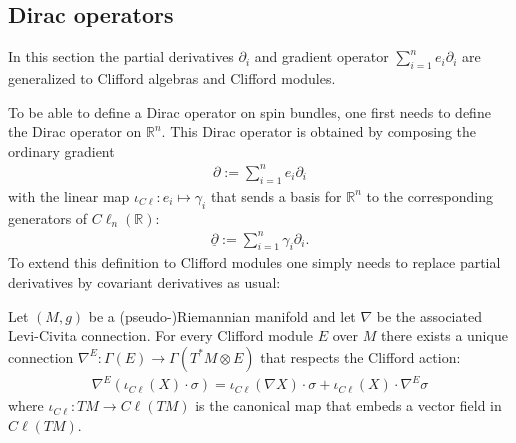 \subsection{Dirac operators}

    In this section the partial derivatives $\partial_i$ and gradient operator $\sum_{i=1}^ne_i\partial_i$ are generalized to Clifford algebras and Clifford modules.



    To be able to define a Dirac operator on spin bundles, one first needs to define the Dirac operator on $\mathbb{R}^n$. This Dirac operator is obtained by composing the ordinary gradient
    \begin{gather}
        \partial:=\sum_{i=1}^ne_i\partial_i
    \end{gather}
    with the linear map $\iota_{C\ell}:e_i\mapsto\gamma_i$ that sends a basis for $\mathbb{R}^n$ to the corresponding generators of $C\ell_n(\mathbb{R})$:
    \begin{gather}
        \underline{\partial} := \sum_{i=1}^n\gamma_i\partial_i.
    \end{gather}
    To extend this definition to Clifford modules one simply needs to replace partial derivatives by covariant derivatives as usual:
    \begin{property}
        Let $(M,g)$ be a (pseudo-)Riemannian manifold and let $\nabla$ be the associated Levi-Civita connection. For every Clifford module $E$ over $M$ there exists a unique connection $\nabla^E:\Gamma(E)\rightarrow \Gamma(T^*M\otimes E)$ that respects the Clifford action:
        \begin{gather}
            \nabla^E(\iota_{C\ell}(X)\cdot\sigma) = \iota_{C\ell}(\nabla X)\cdot\sigma + \iota_{C\ell}(X)\cdot\nabla^E\sigma
        \end{gather}
        where $\iota_{C\ell}:TM\rightarrow C\ell(TM)$ is the canonical map that embeds a vector field in $C\ell(TM)$.
    \end{property}


